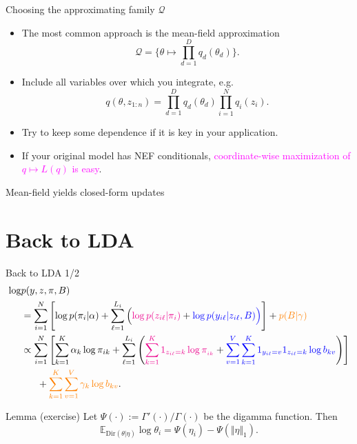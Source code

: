 \documentclass[10pt]{beamer}
\newcommand\un[1]{\textcolor{magenta}{#1}}
\newcommand\unn[1]{\textcolor{blue}{#1}}
\newcommand\unnnn[1]{\textcolor{orange}{#1}}
\begin{document}
\begin{frame}{Choosing the approximating family $\mathcal Q$}
\begin{itemize}
  \item The most common approach is the mean-field approximation
  $$ \mathcal Q = \{\theta\mapsto \prod_{d=1}^D q_d(\theta_d)\}.$$
  \item Include all variables over which you integrate, e.g.
  \vfill
  \vfill
  $$
  q(\theta, z_{1:n}) = \prod_{d=1}^D q_d(\theta_d) \prod_{i=1}^N q_i(z_i).
  $$
\end{itemize}
\begin{itemize}
  \item Try to keep some dependence if it is key in your application.
  \item If your original model has NEF conditionals, \un{coordinate-wise maximization of $q\mapsto L(q)$ is easy}.
\end{itemize}
\end{frame}

\begin{frame}{Mean-field yields closed-form updates}
\end{frame}
\section{Back to LDA}
\begin{frame}{Back to LDA 1/2}
  \footnotesize
\begin{align*}
  \log &p(y, z, \pi, B)\\
  &=\sum_{i=1}^N \left[\log p(\pi_i\vert \alpha) + \sum_{\ell=1}^{L_i} \Big(\un{\log p(z_{i\ell}\vert\pi_i)} + \unn{\log p(y_{i\ell}\vert z_{i\ell}, B)\Big)}\right] + \unnnn{p(B\vert \gamma)}\\
  &\propto \sum_{i=1}^N \left[\sum_{k=1}^K \alpha_k \log \pi_{ik} + \sum_{\ell=1}^{L_i} \left(\un{\sum_{k=1}^K 1_{z_{i\ell}=k}\log\pi_{_{ik}}} + \unn{\sum_{v=1}^V \sum_{k=1}^K 1_{y_{i\ell}=v}1_{z_{i\ell}=k} \log b_{kv}}\right)\right] \\
  &~~~~~+ \unnnn{\sum_{k=1}^K \sum_{v=1}^V \gamma_k\log b_{kv}}.
\end{align*}
\vfill
\vspace{1cm}
\begin{block}{Lemma (exercise)}
Let $\Psi(\cdot) := \Gamma'(\cdot)/\Gamma(\cdot)$ be the digamma function. Then
$$
\mathbb{E}_{\text{Dir}(\theta\vert\eta)} \log \theta_i = \Psi(\eta_i) - \Psi(\Vert \eta\Vert_1).
$$
\end{block}
\vfill
\end{frame}
\end{document}
